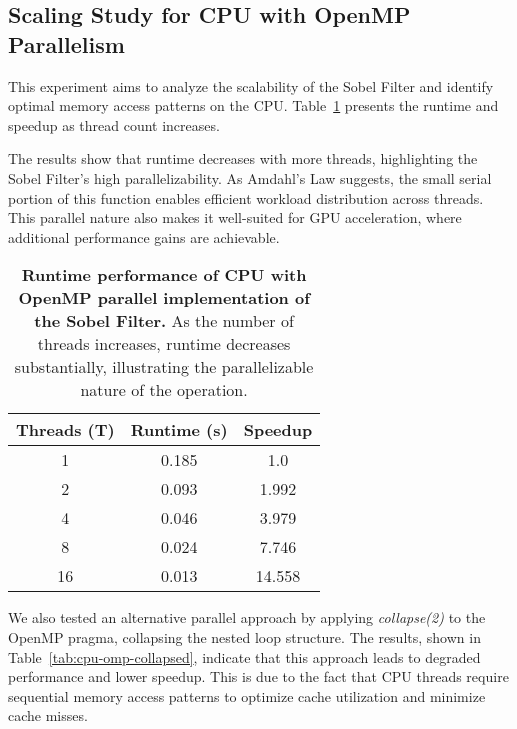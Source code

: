 \subsection{Scaling Study for CPU with OpenMP Parallelism}
\label{subsec:cpu-omp-study}

This experiment aims to analyze the scalability of the Sobel Filter and identify optimal memory access patterns on the CPU. Table~\ref{tab:cpu-omp} presents the runtime and speedup as thread count increases.

The results show that runtime decreases with more threads, highlighting the Sobel Filter’s high parallelizability. As Amdahl's Law \cite{amdahl1967validity} suggests, the small serial portion of this function enables efficient workload distribution across threads. This parallel nature also makes it well-suited for GPU acceleration, where additional performance gains are achievable.

\begin{table}[htbp]
    \centering
    \begin{tabular}{c|cc}
        Threads (T) & Runtime (s) & Speedup \\
        \hline
        1 & 0.185 & 1.0 \\
        2 & 0.093 & 1.992 \\
        4 & 0.046 & 3.979 \\
        8 & 0.024 & 7.746 \\
        16 & 0.013 & 14.558 \\
    \end{tabular}
    \caption{\textbf{Runtime performance of CPU with OpenMP parallel implementation of the Sobel Filter.} As the number of threads increases, runtime decreases substantially, illustrating the parallelizable nature of the operation.}
    \label{tab:cpu-omp}
\end{table}

We also tested an alternative parallel approach by applying \textit{collapse(2)} to the OpenMP pragma, collapsing the nested loop structure. The results, shown in Table~\ref{tab:cpu-omp-collapsed}, indicate that this approach leads to degraded performance and lower speedup. This is due to the fact that CPU threads require sequential memory access patterns to optimize cache utilization and minimize cache misses.

